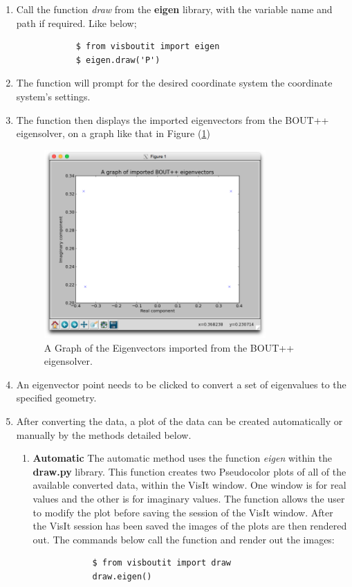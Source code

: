 \documentclass[12pt,a4paper]{article}
\begin{document}
\begin{enumerate}
	\item{Call the function \textit{draw} from the \textbf{eigen} library, with the variable name and path if required. Like below;
		\begin{verbatim}
			$ from visboutit import eigen
			$ eigen.draw('P')
		\end{verbatim}}
	\item{The function will prompt for the desired coordinate system the coordinate system's settings.}
	\item{The function then displays the imported eigenvectors from the BOUT++ eigensolver, on a graph like that in Figure (\ref{fig:eigenvector})}
	\begin{figure}[H]
		\centering
		\includegraphics[width = 0.8\textwidth]{"./images/eigen vectors"}
		\caption{A Graph of the Eigenvectors imported from the BOUT++ eigensolver.}
		\label{fig:eigenvector}
	\end{figure}
	\item{An eigenvector point needs to be clicked to convert a set of eigenvalues to the specified geometry.}
	\item{After converting the data, a plot of the data can be created automatically or manually by the methods detailed below.}
	\begin{enumerate}
		\item{\textbf{Automatic} The automatic method uses the function \textit{eigen} within the \textbf{draw.py} library. This function creates two Pseudocolor plots of all of the available converted data, within the VisIt window. One window is for real values and the other is for imaginary values. The function allows the user to modify the plot before saving the session of the VisIt window. After the VisIt session has been saved the images of the plots are then rendered out. The commands below call the function and render out the images:
			\begin{verbatim}
			$ from visboutit import draw
			draw.eigen()
			\end{verbatim}}
		

\end{enumerate}
\end{enumerate}
\end{document}
